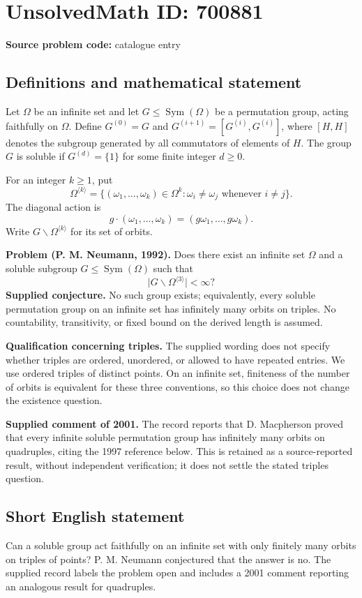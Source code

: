 \documentclass[11pt]{article}
\begin{document}
\section*{UnsolvedMath ID: 700881}
\textbf{Source problem code:} catalogue entry
\subsection{Definitions and mathematical statement}
Let \(\Omega\) be an infinite set and let \(G\leq\operatorname{Sym}(\Omega)\) be a permutation group, acting faithfully on \(\Omega\). Define \(G^{(0)}=G\) and \(G^{(i+1)}=[G^{(i)},G^{(i)}]\), where \([H,H]\) denotes the subgroup generated by all commutators of elements of \(H\). The group \(G\) is soluble if \(G^{(d)}=\{1\}\) for some finite integer \(d\geq 0\).

For an integer \(k\geq 1\), put
\[
\Omega^{\langle k\rangle}=\{(\omega_1,\ldots,\omega_k)\in\Omega^k:\omega_i\neq\omega_j\text{ whenever }i\neq j\}.
\]
The diagonal action is
\[
g\cdot(\omega_1,\ldots,\omega_k)=(g\omega_1,\ldots,g\omega_k).
\]
Write \(G\backslash\Omega^{\langle k\rangle}\) for its set of orbits.

\textbf{Problem (P. M. Neumann, 1992).} Does there exist an infinite set \(\Omega\) and a soluble subgroup \(G\leq\operatorname{Sym}(\Omega)\) such that
\[
\bigl|G\backslash\Omega^{\langle 3\rangle}\bigr|<\infty?
\]
\textbf{Supplied conjecture.} No such group exists; equivalently, every soluble permutation group on an infinite set has infinitely many orbits on triples. No countability, transitivity, or fixed bound on the derived length is assumed.

\textbf{Qualification concerning triples.} The supplied wording does not specify whether triples are ordered, unordered, or allowed to have repeated entries. We use ordered triples of distinct points. On an infinite set, finiteness of the number of orbits is equivalent for these three conventions, so this choice does not change the existence question.

\textbf{Supplied comment of 2001.} The record reports that D. Macpherson proved that every infinite soluble permutation group has infinitely many orbits on quadruples, citing the 1997 reference below. This is retained as a source-reported result, without independent verification; it does not settle the stated triples question.
\subsection{Short English statement}
Can a soluble group act faithfully on an infinite set with only finitely many orbits on triples of points? P. M. Neumann conjectured that the answer is no. The supplied record labels the problem open and includes a 2001 comment reporting an analogous result for quadruples.
\end{document}
